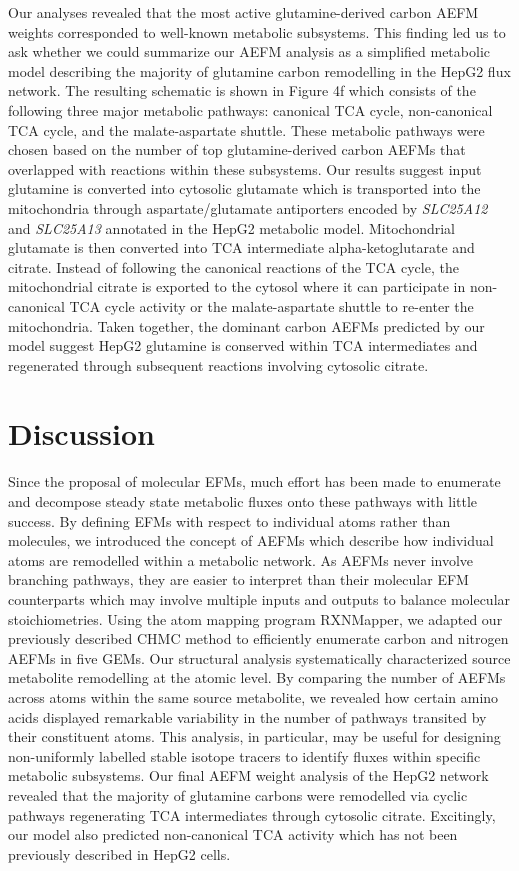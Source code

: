 \documentclass[12pt]{article}
\begin{document}
Our analyses revealed that the most active glutamine-derived carbon AEFM
weights corresponded to well-known metabolic subsystems. This finding led
us to ask whether we could summarize our AEFM analysis as a simplified
metabolic model describing the majority of glutamine carbon remodelling in
the HepG2 flux network. The resulting schematic is shown in Figure 4f
which consists of the following three major metabolic pathways: canonical
TCA cycle, non-canonical TCA cycle, and the malate-aspartate shuttle.
These metabolic pathways were chosen based on the number of top
glutamine-derived carbon AEFMs that overlapped with reactions within these
subsystems. Our results suggest input glutamine is converted into
cytosolic glutamate which is transported into the mitochondria through
aspartate/glutamate antiporters encoded by \textit{SLC25A12} and
\textit{SLC25A13} annotated in the HepG2 metabolic model. Mitochondrial
glutamate is then converted into TCA intermediate alpha-ketoglutarate and
citrate. Instead of following the canonical reactions of the TCA cycle,
the mitochondrial citrate is exported to the cytosol where it can
participate in non-canonical TCA cycle activity or the malate-aspartate
shuttle to re-enter the mitochondria. Taken together, the dominant carbon
AEFMs predicted by our model suggest HepG2 glutamine is conserved within
TCA intermediates and regenerated through subsequent reactions involving
cytosolic citrate.

\section*{Discussion}

Since the proposal of molecular EFMs, much effort has been made to
enumerate and decompose steady state metabolic fluxes onto these pathways
with little success. By defining EFMs with respect to individual atoms
rather than molecules, we introduced the concept of AEFMs which describe
how individual atoms are remodelled within a metabolic network. As AEFMs
never involve branching pathways, they are easier to interpret than their
molecular EFM counterparts which may involve multiple inputs and outputs
to balance molecular stoichiometries. Using the atom mapping program
RXNMapper, we adapted our previously described CHMC method to efficiently
enumerate carbon and nitrogen AEFMs in five GEMs. Our structural analysis
systematically characterized source metabolite remodelling at the atomic
level. By comparing the number of AEFMs across atoms within the same
source metabolite, we revealed how certain amino acids displayed
remarkable variability in the number of pathways transited by their
constituent atoms. This analysis, in particular, may be useful for
designing non-uniformly labelled stable isotope tracers to identify fluxes
within specific metabolic subsystems. Our final AEFM weight analysis of
the HepG2 network revealed that the majority of glutamine carbons were
remodelled via cyclic pathways regenerating TCA intermediates through
cytosolic citrate. Excitingly, our model also predicted non-canonical TCA
activity which has not been previously described in HepG2 cells.
\end{document}
